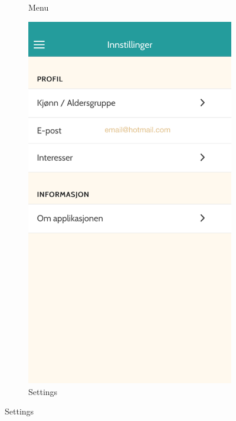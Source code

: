 \begin{appendices}
\begin{figure}[h!]
\begin{subfigure}[h]{0.3\textwidth}
			\caption{Menu}
		\end{subfigure}
		\hspace{1cm}
		\begin{subfigure}[h]{0.3\textwidth}
			\includegraphics[width=\textwidth]{fig/screenshot_settings}
			\caption{Settings}
		\end{subfigure}
		\label{fig:other}
	\end{figure}


\end{appendices}
\cleardoublepage